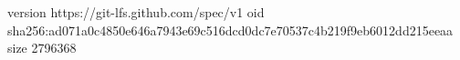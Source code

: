 version https://git-lfs.github.com/spec/v1
oid sha256:ad071a0c4850e646a7943e69c516dcd0dc7e70537c4b219f9eb6012dd215eeaa
size 2796368
